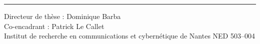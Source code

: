 \begin{titlepage}
\vspace{.5cm}

\hrule

\vspace{.2cm}

\noindent Directeur de thèse : Dominique Barba\\
Co-encadrant : Patrick Le Callet\\
Institut de recherche en communications et cybernétique de Nantes  N\degre ED 503--004
\end{titlepage}
